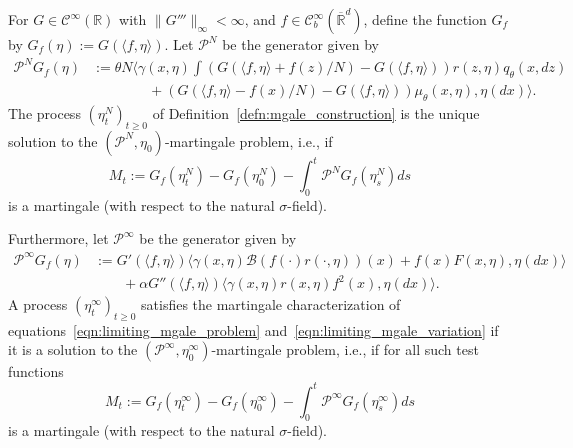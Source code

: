 \documentclass[EJP]{ejpecp} %
\newcommand{\IR}{\mathbb R}
\newcommand{\Pgen}{\mathcal{P}}    %
\begin{document}
\begin{lemma}
    \label{def: MP definition of limit}
For $G \in \mathcal{C}^{\infty}(\IR)$ with $\|G'''\|_\infty<\infty$,
and 
$f \in \mathcal{C}_{b}^\infty(\overline{\IR}^d)$, define the 
function $G_f$ by 
$G_f(\eta):=G (\langle f, \eta \rangle)$.
Let $\Pgen^N$ be the generator given by
\begin{equation}
\begin{aligned}
    \Pgen^N G_f(\eta)
    &:=
    \theta N \bigg\langle
    \gamma(x, \eta)
        \int 
        \left(G(\langle f, \eta \rangle + f(z)/N) - G(\langle f, \eta \rangle)\right)
        r(z,\eta) q_\theta(x,dz)
    \\ & \qquad \qquad {}
    +
    \left(G(\langle f, \eta \rangle - f(x)/N) - G(\langle f, \eta \rangle)\right)
    \mu_\theta(x, \eta),
    \eta(dx) \bigg\rangle .
\end{aligned}
\end{equation}
The process $(\eta^N_t)_{t \geq 0}$ of Definition~\ref{defn:mgale_construction}
is the unique solution to the $(\Pgen^N, \eta_0)$-martingale problem, i.e., if
$$
    M_t :=
    G_f(\eta^N_t) - G_f(\eta^N_0)
    - \int_{0}^{t}\Pgen^N G_f(\eta^N_s)ds
$$
is a martingale (with respect to the natural $\sigma$-field). 

Furthermore, let $\Pgen^\infty$ be the generator given by
\begin{equation}
    \label{eq: Limit Generator Definition}
\begin{aligned}
\Pgen^{\infty} G_f(\eta)
    &:= G'(\langle f, \eta \rangle)
                   \big\langle
                        \gamma(x, \eta)
                            \mathcal{B}\left(
                            f(\cdot) r(\cdot, \eta)
                            \right)(x)
                    +
                    f(x) F(x, \eta),
                    \eta(dx)
                    \big\rangle \\
               &\qquad {}
               + \alpha G''(\langle f, \eta \rangle)
                  \big\langle
                    \gamma\left( x, \eta \right)
                    r\left(x,\eta \right)
                    f^2(x),
                    \eta (dx)
                    \big\rangle  .
\end{aligned}    
\end{equation}
A process $(\eta^{\infty}_t)_{t \geq 0}$ 
satisfies the martingale characterization of equations~\eqref{eqn:limiting_mgale_problem}
and~\eqref{eqn:limiting_mgale_variation}
if it is a solution %
to the $(\Pgen^{\infty}, \eta^\infty_0)$-martingale problem, i.e.,
if for all such test functions 
$$
    M_t :=
    G_f(\eta^{\infty}_t) - G_f(\eta^\infty_0)
    - \int_{0}^{t}\Pgen^{\infty}G_f(\eta^{\infty}_s)ds
$$
is a martingale (with respect to the natural $\sigma$-field). 
\end{lemma}
\end{document}
